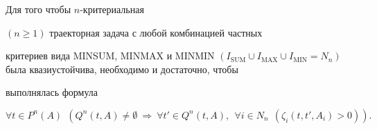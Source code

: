 \begin{cor}


Для того чтобы $n$-критериальная


$(n\geq 1)$ траекторная задача с любой комбинацией частных


критериев вида MINSUM, MINMAX и MINMIN $(I_{\mathrm{SUM}}\cup I_{\mathrm{MAX}}


\cup I_{\mathrm{MIN}}=N_n)$ была квазиустойчива, необходимо и достаточно, чтобы


выполнялась формула


\begin{equation}\label{sled2-1}


\forall t\in P^n(A) \ \ ( Q^n(t, A)\neq \emptyset \


\Rightarrow \ \forall t'\in Q^n(t, A),\ \ \forall i \in N_n


\ \ (\zeta_i(t, t', A_i)>0) ).


\end{equation}


\end{cor}





